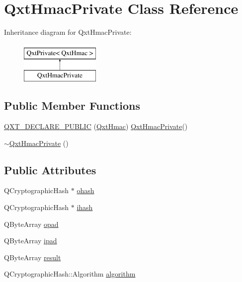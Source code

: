 \hypertarget{class_qxt_hmac_private}{\section{Qxt\-Hmac\-Private Class Reference}
\label{class_qxt_hmac_private}
}
Inheritance diagram for Qxt\-Hmac\-Private\-:\begin{figure}[H]
\begin{center}
\leavevmode
\includegraphics[height=2.000000cm]{class_qxt_hmac_private}
\end{center}
\end{figure}
\subsection*{Public Member Functions}
\begin{DoxyCompactItemize}
\item 
\hyperlink{class_qxt_hmac_private_a9b7abc3348a8dab5da924406b5328f48}{Q\-X\-T\-\_\-\-D\-E\-C\-L\-A\-R\-E\-\_\-\-P\-U\-B\-L\-I\-C} (\hyperlink{class_qxt_hmac}{Qxt\-Hmac}) \hyperlink{class_qxt_hmac_private}{Qxt\-Hmac\-Private}()
\item 
\hyperlink{class_qxt_hmac_private_a800175b744de67b5bd3b62341d0ae13e}{$\sim$\-Qxt\-Hmac\-Private} ()
\end{DoxyCompactItemize}
\subsection*{Public Attributes}
\begin{DoxyCompactItemize}
\item 
Q\-Cryptographic\-Hash $\ast$ \hyperlink{class_qxt_hmac_private_ab57ea96b732394d617e3841d3c097183}{ohash}
\item 
Q\-Cryptographic\-Hash $\ast$ \hyperlink{class_qxt_hmac_private_a58e5aca9ff01b6c0a74bc9908baea4ac}{ihash}
\item 
Q\-Byte\-Array \hyperlink{class_qxt_hmac_private_a30b7c9267ff18b47d2eb980ecd67e607}{opad}
\item 
Q\-Byte\-Array \hyperlink{class_qxt_hmac_private_a8a4243cf84dc4de4934b6d1fdf998eab}{ipad}
\item 
Q\-Byte\-Array \hyperlink{class_qxt_hmac_private_a75da1364701463ef1b395c3a380d28d2}{result}
\item 
Q\-Cryptographic\-Hash\-::\-Algorithm \hyperlink{class_qxt_hmac_private_a727bde03883e6235b3f6d09d60cffd8b}{algorithm}
\end{DoxyCompactItemize}
